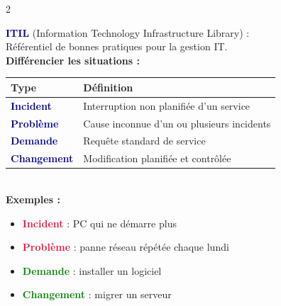 \documentclass[a4paper,10pt]{article}
\newcommand{\key}[1]{\textbf{\textcolor{navy}{#1}}}
\newcommand{\warn}[1]{\textbf{\textcolor{crimson}{#1}}}
\newcommand{\ok}[1]{\textbf{\textcolor{green}{#1}}}
\begin{document}
\begin{multicols}{2}
\begin{tcolorbox}[basebox, colframe=crimson, title=4. Gestion des Incidents — ITIL]
\key{ITIL} (Information Technology Infrastructure Library) :\\
Référentiel de bonnes pratiques pour la gestion IT.\\[4pt]
\textbf{Différencier les situations :}
\begin{tabular}{ll}
\toprule
\textbf{Type} & \textbf{Définition} \\
\midrule
\key{Incident} & Interruption non planifiée d'un service \\
\key{Problème} & Cause inconnue d'un ou plusieurs incidents \\
\key{Demande} & Requête standard de service \\
\key{Changement} & Modification planifiée et contrôlée \\
\bottomrule
\end{tabular}
\vspace{4pt}\\
\textbf{Exemples :}
\begin{itemize}
  \item \warn{Incident} : PC qui ne démarre plus
  \item \warn{Problème} : panne réseau répétée chaque lundi
  \item \ok{Demande} : installer un logiciel
  \item \ok{Changement} : migrer un serveur
\end{itemize}
\end{tcolorbox}


\end{multicols}
\end{document}
